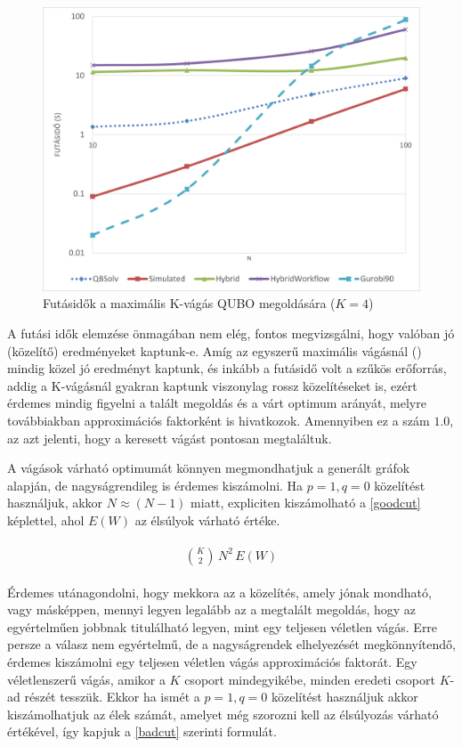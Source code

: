 \begin{figure}[!ht]
	\centering
	\includegraphics[width=150mm, keepaspectratio]{figures/diagrams/maxKCutQUBO_K4.png}
	\caption{Futásidők a maximális K-vágás QUBO megoldására ($K=4$)}
	\label{fig:maxKCutQUBO_K4}
\end{figure}

A futási idők elemzése önmagában nem elég, fontos megvizsgálni, hogy valóban jó (közelítő) eredményeket kaptunk-e. Amíg az egyszerű maximális vágásnál () mindig közel jó eredményt kaptunk, és inkább a futásidő volt a szűkös erőforrás, addig a K-vágásnál gyakran kaptunk viszonylag rossz közelítéseket is, ezért érdemes mindig figyelni a talált megoldás és a várt optimum arányát, melyre továbbiakban approximációs faktorként is hivatkozok. Amennyiben ez a szám $1.0$, az azt jelenti, hogy a keresett vágást pontosan megtaláltuk.

A vágások várható optimumát könnyen megmondhatjuk a generált gráfok alapján, de nagyságrendileg is érdemes kiszámolni. Ha $p=1, q=0$ közelítést használjuk, akkor $N \approx (N-1)$ miatt, expliciten kiszámolható a \ref{goodcut} képlettel, ahol $E(W)$ az élsúlyok várható értéke.

\begin{align}
	\begin{split}
		\binom{K}{2} \, N^2 \, E(W) \label{goodcut}		
	\end{split}
\end{align}

Érdemes utánagondolni, hogy mekkora az a közelítés, amely jónak mondható, vagy másképpen, mennyi legyen legalább az a megtalált megoldás, hogy az egyértelműen jobbnak titulálható legyen, mint egy teljesen véletlen vágás. Erre persze a válasz nem egyértelmű, de a nagyságrendek elhelyezését megkönnyítendő, érdemes kiszámolni egy teljesen véletlen vágás approximációs faktorát. Egy véletlenszerű vágás, amikor a $K$ csoport mindegyikébe, minden eredeti csoport $K$-ad részét tesszük. Ekkor ha ismét a $p=1, q=0$ közelítést használjuk akkor kiszámolhatjuk az élek számát, amelyet még szorozni kell az élsúlyozás várható értékével, így kapjuk a \ref{badcut} szerinti formulát. 


